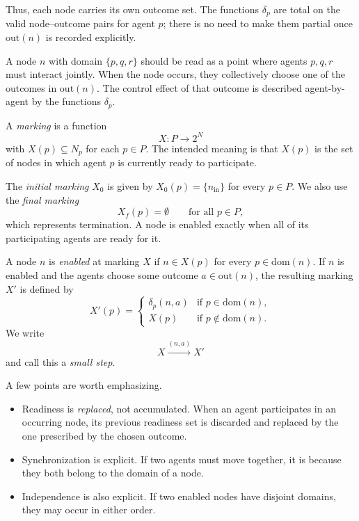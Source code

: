 Thus, each node carries its own outcome set. The functions $\delta_p$ are total on the valid node--outcome pairs for agent $p$; there is no need to make them partial once $\mathrm{out}(n)$ is recorded explicitly.

A node $n$ with domain $\{p,q,r\}$ should be read as a point where agents $p,q,r$ must interact jointly. When the node occurs, they collectively choose one of the outcomes in $\mathrm{out}(n)$. The control effect of that outcome is described agent-by-agent by the functions $\delta_p$.

\begin{definition}[Marking]
A \emph{marking} is a function
\[
X : P \to 2^N
\]
with $X(p) \subseteq N_p$ for each $p \in P$. The intended meaning is that $X(p)$ is the set of nodes in which agent $p$ is currently ready to participate.
\end{definition}

The \emph{initial marking} $X_0$ is given by $X_0(p)=\{n_{\mathrm{in}}\}$ for every $p \in P$. We also use the \emph{final marking}
\[
X_f(p)=\emptyset \qquad \text{for all } p \in P,
\]
which represents termination. A node is enabled exactly when all of its participating agents are ready for it.

\begin{definition}
A node $n$ is \emph{enabled} at marking $X$ if $n \in X(p)$ for every $p \in \mathrm{dom}(n)$. If $n$ is enabled and the agents choose some outcome $a \in \mathrm{out}(n)$, the resulting marking $X'$ is defined by
\[
X'(p)=
\begin{cases}
\delta_p(n,a) & \text{if } p \in \mathrm{dom}(n),\\
X(p) & \text{if } p \notin \mathrm{dom}(n).
\end{cases}
\]
We write
\[
X \xrightarrow{(n,a)} X'
\]
and call this a \emph{small step}.
\end{definition}

A few points are worth emphasizing.
\begin{itemize}
    \item Readiness is \emph{replaced}, not accumulated. When an agent participates in an occurring node, its previous readiness set is discarded and replaced by the one prescribed by the chosen outcome.
    \item Synchronization is explicit. If two agents must move together, it is because they both belong to the domain of a node.
    \item Independence is also explicit. If two enabled nodes have disjoint domains, they may occur in either order.
\end{itemize}

